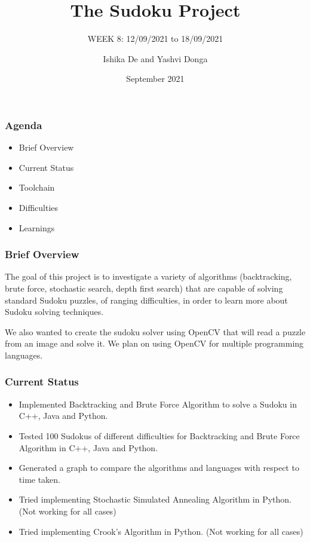 \documentclass{beamer}
\title{The Sudoku Project}
\subtitle{WEEK 8: 12/09/2021 to 18/09/2021}
\author[Ishika | Yashvi]{Ishika De and Yashvi Donga}
\date{September 2021}
\begin{document}
\begin{frame}
     \titlepage
\end{frame}
\begin{frame}
     \frametitle{Agenda}
     \begin{itemize}
          \item Brief Overview
          \item Current Status
          \item Toolchain
          \item Difficulties
          \item Learnings
     \end{itemize}
\end{frame}

\begin{frame}
     \frametitle{Brief Overview}
     The goal of this project is to investigate a variety of algorithms (backtracking, brute force, stochastic search, depth first search) that are capable of solving
standard Sudoku puzzles, of ranging difficulties, in order to learn more about Sudoku
solving techniques.\newline

     We also wanted to create the sudoku solver using OpenCV that will read a puzzle from an image and solve it. We plan on using OpenCV for multiple programming languages.
\end{frame}

\begin{frame}
     \frametitle{Current Status}   
     \begin{itemize}
		  \item Implemented Backtracking and Brute Force Algorithm to solve a Sudoku in C++, Java and Python.
		  \item Tested 100 Sudokus of different difficulties for Backtracking and Brute Force Algorithm in C++, Java and Python.
		  \item Generated a graph to compare the algorithms and languages with respect to time taken.
		  \item Tried implementing Stochastic Simulated Annealing Algorithm in Python. (Not working for all cases) 
		  \item Tried implementing Crook's Algorithm in Python. (Not working for all cases)
	 \end{itemize}
\end{frame}
\end{document}
